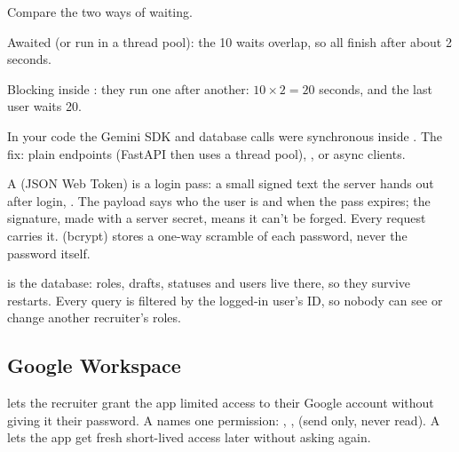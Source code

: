 \begin{example}
Compare the two ways of waiting.
\begin{steps}
  \item Awaited (or run in a thread pool): the 10 waits overlap, so all finish after about 2 seconds.
  \item Blocking inside : they run one after another: $10 \times 2 = 20$ seconds, and the last user waits 20.
  \item In your code the Gemini SDK and database calls were synchronous inside . The fix: plain  endpoints (FastAPI then uses a thread pool), , or async clients.
\end{steps}
\end{example}

\begin{definition}
A  (JSON Web Token) is a login pass: a small signed text the server hands out after login, . The payload says who the user is and when the pass expires; the signature, made with a server secret, means it can't be forged. Every request carries it.  (bcrypt) stores a one-way scramble of each password, never the password itself.
\end{definition}

\begin{definition}
 is the database: roles, drafts, statuses and users live there, so they survive restarts. Every query is filtered by the logged-in user's ID, so nobody can see or change another recruiter's roles.
\end{definition}

\subsection*{Google Workspace}

\begin{definition}
 lets the recruiter grant the app limited access to their Google account without giving it their password. A  names one permission: , ,  (send only, never read). A  lets the app get fresh short-lived access later without asking again.
\end{definition}

